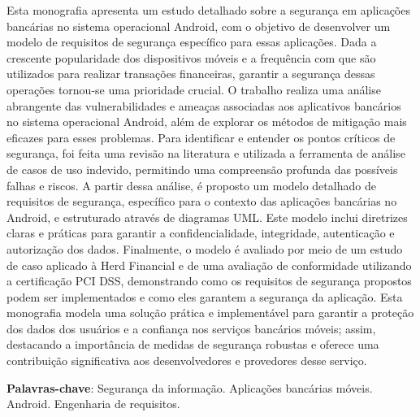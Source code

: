 \setlength{\absparsep}{18pt} %


\begin{resumo}
Esta monografia apresenta um estudo detalhado sobre a segurança em aplicações bancárias no sistema operacional Android, com o objetivo de desenvolver um modelo de requisitos de segurança específico para essas aplicações. Dada a crescente popularidade dos dispositivos móveis e a frequência com que são utilizados para realizar transações financeiras, garantir a segurança dessas operações tornou-se uma prioridade crucial. O trabalho realiza uma análise abrangente das vulnerabilidades e ameaças associadas aos aplicativos bancários no sistema operacional Android, além de explorar os métodos de mitigação mais eficazes para esses problemas. Para identificar e entender os pontos críticos de segurança, foi feita uma revisão na literatura e utilizada a ferramenta de análise de casos de uso indevido, permitindo uma compreensão profunda das possíveis falhas e riscos. A partir dessa análise, é proposto um modelo detalhado de requisitos de segurança, específico para o contexto das aplicações bancárias no Android, e estruturado através de diagramas UML. Este modelo inclui diretrizes claras e práticas para garantir a confidencialidade, integridade, autenticação e autorização dos dados. Finalmente, o modelo é avaliado por meio de um estudo de caso aplicado à Herd Financial e de uma avaliação de conformidade utilizando a certificação PCI DSS, demonstrando como os requisitos de segurança propostos podem ser implementados e como eles garantem a segurança da aplicação. Esta monografia modela uma solução prática e implementável para garantir a proteção dos dados dos usuários e a confiança nos serviços bancários móveis; assim, destacando a importância de medidas de segurança robustas e oferece uma contribuição significativa aos desenvolvedores e provedores desse serviço.

 \textbf{Palavras-chave}: Segurança da informação. Aplicações bancárias móveis. Android. Engenharia de requisitos.
\end{resumo}

